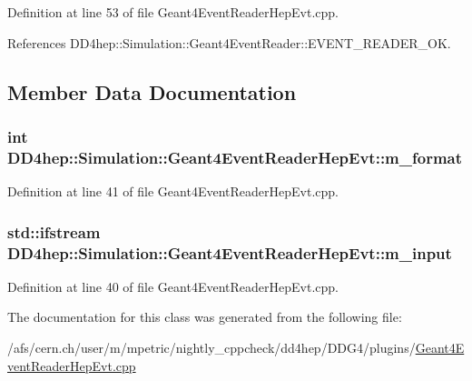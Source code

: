 Definition at line 53 of file Geant4EventReaderHepEvt.cpp.

References DD4hep::Simulation::Geant4EventReader::EVENT\_\-READER\_\-OK.

\subsection{Member Data Documentation}
\hypertarget{class_d_d4hep_1_1_simulation_1_1_geant4_event_reader_hep_evt_a7d4105611f4277b52394d78aae4de38e}{
\subsubsection[{m\_\-format}]{\setlength{\rightskip}{0pt plus 5cm}int {\bf DD4hep::Simulation::Geant4EventReaderHepEvt::m\_\-format}}}
\label{class_d_d4hep_1_1_simulation_1_1_geant4_event_reader_hep_evt_a7d4105611f4277b52394d78aae4de38e}


Definition at line 41 of file Geant4EventReaderHepEvt.cpp.\hypertarget{class_d_d4hep_1_1_simulation_1_1_geant4_event_reader_hep_evt_ac65db88522c8b307f04ae3ec193fbcb5}{
\subsubsection[{m\_\-input}]{\setlength{\rightskip}{0pt plus 5cm}std::ifstream {\bf DD4hep::Simulation::Geant4EventReaderHepEvt::m\_\-input}}}
\label{class_d_d4hep_1_1_simulation_1_1_geant4_event_reader_hep_evt_ac65db88522c8b307f04ae3ec193fbcb5}


Definition at line 40 of file Geant4EventReaderHepEvt.cpp.

The documentation for this class was generated from the following file:\begin{DoxyCompactItemize}
\item 
/afs/cern.ch/user/m/mpetric/nightly\_\-cppcheck/dd4hep/DDG4/plugins/\hyperlink{_geant4_event_reader_hep_evt_8cpp}{Geant4EventReaderHepEvt.cpp}\end{DoxyCompactItemize}
